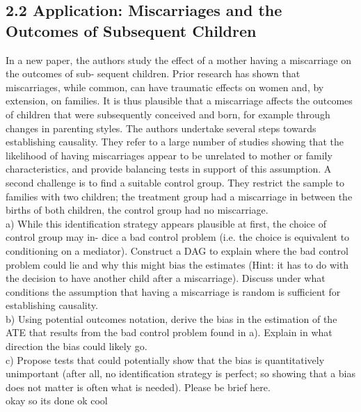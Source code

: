 \documentclass[a4paper,12pt,oneside,English]{article}
\begin{document}
\subsection{2.2 
Application: Miscarriages and the Outcomes of Subsequent Children}
In a new paper, the authors study the effect of a mother having a miscarriage on the outcomes of sub- sequent children. Prior research has shown that miscarriages, while common, can have traumatic effects on women and, by extension, on families. It is thus plausible that a miscarriage affects the outcomes of children that were subsequently conceived and born, for example through changes in parenting styles.
The authors undertake several steps towards establishing causality. They refer to a large number of studies showing that the likelihood of having miscarriages appear to be unrelated to mother or family characteristics, and provide balancing tests in support of this assumption. A second challenge is to find a suitable control group. They restrict the sample to families with two children; the treatment group had a miscarriage in between the births of both children, the control group had no miscarriage.\\

a) While this identification strategy appears plausible at first, the choice of control group may in- dice a bad control problem (i.e. the choice is equivalent to conditioning on a mediator). Construct a DAG to explain where the bad control problem could lie and why this might bias the estimates (Hint: it has to do with the decision to have another child after a miscarriage). Discuss under what conditions the assumption that having a miscarriage is random is sufficient for establishing causality.\\
b) Using potential outcomes notation, derive the bias in the estimation of the ATE that results from the bad control problem found in a). Explain in what direction the bias could likely go.\\
c) Propose tests that could potentially show that the bias is quantitatively unimportant (after all, no identification strategy is perfect; so showing that a bias does not matter is often what is needed). Please be brief here.\\


okay so its done
ok cool
\end{document}
